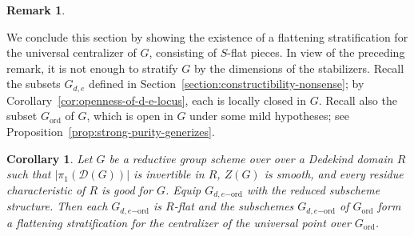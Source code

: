 \documentclass[11pt,reqno]{amsart}
\newtheorem{cor}[theorem]{Corollary}
\theoremstyle{definition}
\newtheorem{remark}[theorem]{Remark}
\renewcommand{\rm}{\mathrm}
\newcommand{\sD}{{\mathscr D}}
\DeclareMathOperator{\Ad}{Ad}
\DeclareMathOperator{\Lie}{Lie}
\begin{document}
\begin{remark}

\end{remark}

We conclude this section by showing the existence of a flattening stratification for the universal centralizer of $G$, consisting of $S$-flat pieces. In view of the preceding remark, it is not enough to stratify $G$ by the dimensions of the stabilizers. Recall the subsets $G_{d, e}$ defined in Section~\ref{section:constructibility-nonsense}; by Corollary~\ref{cor:openness-of-d-e-locus}, each is locally closed in $G$. Recall also the subset $G_{\rm{ord}}$ of $G$, which is open in $G$ under some mild hypotheses; see Proposition~\ref{prop:strong-purity-generizes}.

\begin{cor}\label{cor:flat-strat}
Let $G$ be a reductive group scheme over over a Dedekind domain $R$ such that $|\pi_1(\sD(G))|$ is invertible in $R$, $Z(G)$ is smooth, and every residue characteristic of $R$ is good for $G$. Equip $G_{d, e\rm{-ord}}$ with the reduced subscheme structure. Then each $G_{d, e\rm{-ord}}$ is $R$-flat and the subschemes $G_{d, e\rm{-ord}}$ of $G_{\rm{ord}}$ form a flattening stratification for the centralizer of the universal point over $G_{\rm{ord}}$.
\end{cor}
\end{document}
